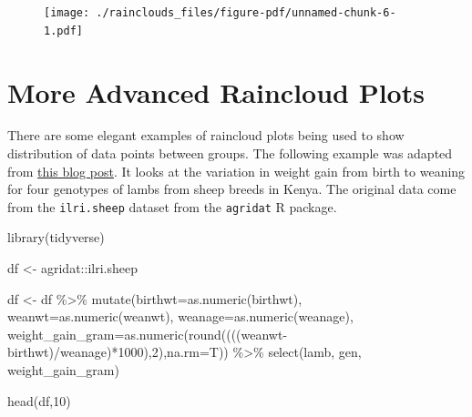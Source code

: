 \documentclass[
  letterpaper,
  DIV=11,
  numbers=noendperiod]{scrreprt}
\newenvironment{Shaded}{\begin{snugshade}}{\end{snugshade}}
\newcommand{\AttributeTok}[1]{\textcolor[rgb]{0.40,0.45,0.13}{#1}}
\newcommand{\DecValTok}[1]{\textcolor[rgb]{0.68,0.00,0.00}{#1}}
\newcommand{\FunctionTok}[1]{\textcolor[rgb]{0.28,0.35,0.67}{#1}}
\newcommand{\NormalTok}[1]{\textcolor[rgb]{0.00,0.23,0.31}{#1}}
\newcommand{\OtherTok}[1]{\textcolor[rgb]{0.00,0.23,0.31}{#1}}
\newcommand{\SpecialCharTok}[1]{\textcolor[rgb]{0.37,0.37,0.37}{#1}}
\begin{document}
\begin{figure}[H]

{\centering \texttt{[image: ./rainclouds\_files/figure-pdf/unnamed-chunk-6-1.pdf]}

}

\end{figure}

\hypertarget{more-advanced-raincloud-plots}{%
\section{More Advanced Raincloud
Plots}\label{more-advanced-raincloud-plots}}

There are some elegant examples of raincloud plots being used to show
distribution of data points between groups. The following example was
adapted from
\href{https://medium.com/@amorimfranchi/raincloud-plots-for-clear-precise-and-efficient-data-communication-4c71d0a37c23}{this
blog post}. It looks at the variation in weight gain from birth to
weaning for four genotypes of lambs from sheep breeds in Kenya. The
original data come from the \texttt{ilri.sheep} dataset from the
\texttt{agridat} R package.

\begin{Shaded}
\begin{Highlighting}[]
\FunctionTok{library}\NormalTok{(tidyverse)}

\NormalTok{df }\OtherTok{\textless{}{-}}\NormalTok{ agridat}\SpecialCharTok{::}\NormalTok{ilri.sheep}

\NormalTok{df }\OtherTok{\textless{}{-}}\NormalTok{ df }\SpecialCharTok{\%\textgreater{}\%} \FunctionTok{mutate}\NormalTok{(}\AttributeTok{birthwt=}\FunctionTok{as.numeric}\NormalTok{(birthwt),}
                       \AttributeTok{weanwt=}\FunctionTok{as.numeric}\NormalTok{(weanwt),}
                       \AttributeTok{weanage=}\FunctionTok{as.numeric}\NormalTok{(weanage),}
                       \AttributeTok{weight\_gain\_gram=}\FunctionTok{as.numeric}\NormalTok{(}\FunctionTok{round}\NormalTok{((((weanwt}\SpecialCharTok{{-}}\NormalTok{birthwt)}\SpecialCharTok{/}\NormalTok{weanage)}\SpecialCharTok{*}\DecValTok{1000}\NormalTok{),}\DecValTok{2}\NormalTok{),}\AttributeTok{na.rm=}\NormalTok{T)) }\SpecialCharTok{\%\textgreater{}\%}
                 \FunctionTok{select}\NormalTok{(lamb, gen, weight\_gain\_gram)}


\FunctionTok{head}\NormalTok{(df,}\DecValTok{10}\NormalTok{) }
\end{Highlighting}
\end{Shaded}
\end{document}
